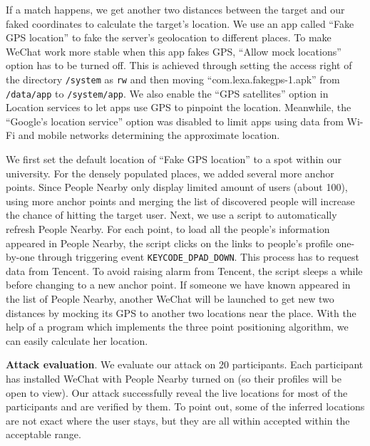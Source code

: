 \documentclass{sig-alternate}
\newcommand{\ignore}[1]{}
\begin{document}
\begin{figure}[t]
\end{figure}


If a match happens, we get another two distances between the target and our faked coordinates to calculate the target's location. We use an app called ``Fake GPS location'' \cite{fakegps} to fake the server's geolocation to different places. To make WeChat work more stable when this app fakes GPS, ``Allow mock locations'' option has to be turned off. This is achieved through setting the access right of the directory \texttt{/system} as \texttt{rw} and then moving ``com.lexa.fakegps-1.apk'' from \texttt{/data/app} to \texttt{/system/app}. We also enable the ``GPS satellites'' option in Location services to let apps use GPS to pinpoint the location. Meanwhile, the ``Google's location service'' option was disabled to limit apps using data from Wi-Fi and mobile networks determining the approximate location.



We first set the default location of ``Fake GPS location'' to a spot within our university. For the densely populated places, we added several more anchor points. Since People Nearby only display limited amount of users (about 100), using more anchor points and merging the list of discovered people will increase the chance of hitting the target user. Next, we use a script to automatically refresh People Nearby. For each point, to load all the people's information appeared in People Nearby, the script clicks on the links to people's profile one-by-one through triggering event \texttt{KEYCODE\_DPAD\_DOWN}. This process has to request data from Tencent. To avoid raising alarm from Tencent, the script sleeps a while before changing to a new anchor point. If someone we have known appeared in the list of People Nearby, another WeChat will be launched to get new two distances by mocking its GPS to another two locations near the place. With the help of a program which implements the three point positioning algorithm, we can easily calculate her location.


\vspace{2pt}\noindent\textbf{Attack evaluation}.
We evaluate our attack on 20 participants. Each participant has installed WeChat with People Nearby turned on (so their profiles will be open to view). \ignore{Should have concrete result...} Our attack successfully reveal the live locations for most of the participants and are verified by them. To point out, some of the inferred locations are not exact where the user stays, but they are all within accepted within the acceptable range.
\end{document}
